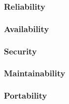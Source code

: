 \subsubsection{Reliability}
\subsubsection{Availability}
\subsubsection{Security}
\subsubsection{Maintainability}
\subsubsection{Portability}





